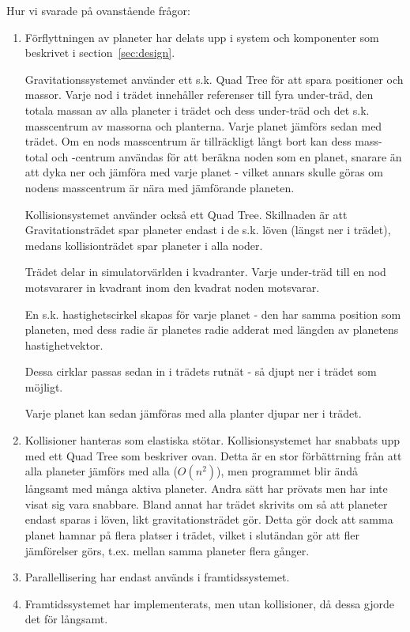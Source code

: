 
Hur vi svarade på ovanstående frågor:
\begin{enumerate}
    \item Förflyttningen av planeter har delats upp i system och komponenter
        som beskrivet i section~\ref{sec:design}.

        \vspace{6pt}

        Gravitationssystemet använder ett s.k. Quad Tree för att
        spara positioner och massor.
        Varje nod i trädet innehåller referenser till fyra under-träd, 
        den totala massan av alla planeter i trädet och dess under-träd
        och det s.k. masscentrum av massorna och planterna.
        Varje planet jämförs sedan med trädet.
        Om en nods masscentrum är tillräckligt långt bort kan
        dess mass-total och -centrum
        användas för att beräkna noden som en planet, snarare än att
        dyka ner och jämföra med varje planet - vilket annars skulle göras
        om nodens masscentrum är nära med jämförande planeten.

        \vspace{6pt}

        Kollisionsystemet använder också ett Quad Tree.
        Skillnaden är att Gravitationsträdet spar planeter endast i
        de s.k. löven (längst ner i trädet), medans kollisionträdet
        spar planeter i alla noder.

        Trädet delar in simulatorvärlden i kvadranter.
        Varje under-träd till en nod motsvararer in kvadrant inom
        den kvadrat noden motsvarar.

        En s.k. hastighetscirkel skapas för varje planet - 
        den har samma position som planeten, med dess radie
        är planetes radie adderat med längden av planetens hastighetvektor.

        Dessa cirklar passas sedan in i trädets rutnät - så djupt ner i
        trädet som möjligt.

        Varje planet kan sedan jämföras med alla planter djupar ner i trädet.

    \item Kollisioner hanteras som elastiska stötar.
        Kollisionsystemet har snabbats upp med ett Quad Tree som beskriver
        ovan. Detta är en stor förbättrning från att alla planeter
        jämförs med alla ($O(n^2)$), men programmet blir ändå långsamt med
        många aktiva planeter.
        Andra sätt har prövats men har inte visat sig vara snabbare.
        Bland annat har trädet skrivits om så att planeter endast sparas
        i löven, likt gravitationsträdet gör. Detta gör
        dock att samma planet hamnar på flera platser i trädet, vilket
        i slutändan gör att fler jämförelser görs, t.ex. mellan samma
        planeter flera gånger.
    \item Parallellisering har endast används i framtidssystemet.
    \item Framtidssystemet har implementerats, men utan kollisioner,
        då dessa gjorde det för långsamt.
\end{enumerate}
